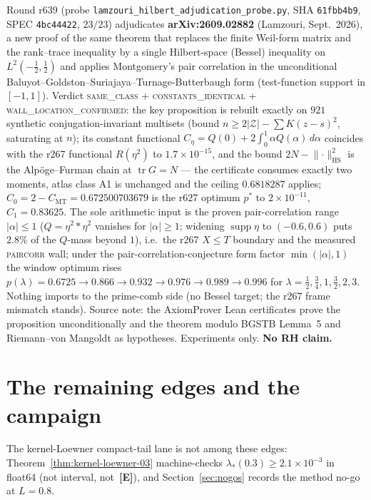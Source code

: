 \documentclass[11pt]{article}
\newcommand{\mE}{\textcolor{certgreen}{\textbf{[E]}}}
\theoremstyle{definition}
\theoremstyle{remark}
\begin{document}
\noindent Round r639 (probe \texttt{lamzouri\_hilbert\_adjudication\_probe.py},
SHA \texttt{61fbb4b9}, SPEC \texttt{4bc44422}, $23/23$) adjudicates
\textbf{arXiv:2609.02882} (Lamzouri, Sept.~2026), a new proof of the same
theorem that replaces the finite Weil-form matrix and the rank--trace
inequality by a single Hilbert-space (Bessel) inequality on
$L^2(-\tfrac12,\tfrac12)$ and applies Montgomery's pair correlation in the
unconditional Baluyot--Goldston--Suriajaya--Turnage-Butterbaugh form
(test-function support in $[-1,1]$).  Verdict \textsc{same\_class} +
\textsc{constants\_identical} + \textsc{wall\_location\_confirmed}: the key
proposition is rebuilt exactly on $921$ synthetic conjugation-invariant
multisets (bound $n\ge 2\lvert\mathcal Z\rvert-\sum K(z-s)^2$, saturating
at $n$); its constant functional $C_\eta=Q(0)+2\int_0^1\alpha
Q(\alpha)\,d\alpha$ coincides with the r267 functional $R(\eta^2)$ to
$1.7\times10^{-15}$, and the bound $2N-\lVert\cdot\rVert_{\mathrm{HS}}^2$
is the Alp\"oge--Furman chain at $\operatorname{tr}G=N$ --- the
certificate consumes exactly two moments, atlas class A1 is unchanged and
the ceiling $0.6818287$ applies; $C_0=2-C_{\mathrm{MT}}=0.672500703679$ is
the r627 optimum $p^*$ to $2\times10^{-11}$, $C_1=0.83625$.  The sole
arithmetic input is the proven pair-correlation range $\lvert\alpha\rvert\le1$
($Q=\eta^2*\eta^2$ vanishes for $\lvert\alpha\rvert\ge1$; widening
$\operatorname{supp}\eta$ to $(-0.6,0.6)$ puts $2.8\%$ of the $Q$-mass
beyond $1$), i.e.\ the r267 $X\le T$ boundary and the measured
\textsc{paircorr} wall; under the pair-correlation-conjecture form factor
$\min(\lvert\alpha\rvert,1)$ the window optimum rises
$p(\lambda)=0.6725\to0.866\to0.932\to0.976\to0.989\to0.996$ for
$\lambda=\tfrac12,\tfrac34,1,\tfrac32,2,3$.  Nothing imports to the
prime-comb side (no Bessel target; the r267 frame mismatch stands).
Source note: the AxiomProver Lean certificates prove the proposition
unconditionally and the theorem modulo BGSTB Lemma~5 and
Riemann--von Mangoldt as hypotheses.  Experiments only.
\textbf{No RH claim.}

\section{The remaining edges and the campaign}\label{sec:edges}

\noindent The kernel-Loewner compact-tail lane is not among these edges:
Theorem~\ref{thm:kernel-loewner-03} machine-checks $\lambda_*(0.3)\ge 2.1{\times}10^{-3}$ in float64
(not interval, not~\mE),
and Section~\ref{sec:nogos} records the method no-go at $L=0.8$.
\end{document}
